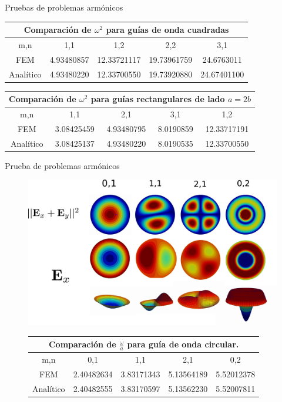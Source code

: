 \documentclass[xcolor=table,serif]{beamer}
\begin{document}
	\begin{frame}{Pruebas de problemas armónicos}
		\begin{center}
		\begin{tabular}{|c|c|c|c|c|}
		\hline
		\multicolumn{5}{|c|}{Comparación de $\omega^2$ para guías de onda cuadradas} \\
		\hline 
		m,n & 1,1 & 1,2 & 2,2 & 3,1 \\ 
		\hline 
		FEM & 4.93480857 & 12.33721117 & 19.73961759 & 24.6763011 \\ 
		\hline 
		Analítico & 4.93480220 & 12.33700550 & 19.73920880 & 24.67401100 \\ 
		\hline 
		\end{tabular} 
		\end{center}
		\begin{center}
	\begin{tabular}{|c|c|c|c|c|}
	\hline
	\multicolumn{5}{|c|}{Comparación de $\omega^2$ para guías rectangulares de lado $a =2b$} \\
	\hline 
	m,n & 1,1 & 2,1 & 3,1 & 1,2 \\ 
	\hline 
	FEM     & 3.08425459 & 4.93480795 & 8.0190859 & 12.33717191 \\ 
	\hline 
	Analítico & 3.08425137 & 4.93480220 & 8.0190535 & 12.33700550 \\ 
	\hline 
	\end{tabular} 
	\end{center}
	\end{frame}
	\begin{frame}{Prueba de problemas armónicos}
	\begin{figure}
\centering
\includegraphics[scale=0.07]{circular_waveguide.eps}
\small
\begin{center}
\begin{tabular}{|c|c|c|c|c|}
\hline
\multicolumn{5}{|c|}{Comparación de $\frac{\omega}{a}$ para guía de onda circular.} \\
\hline 
m,n & 0,1 & 1,1 & 2,1 & 0,2 \\ 
\hline 
FEM     & 2.40482634 & 3.83171343 & 5.13564189 & 5.52012378 \\ 
\hline 
Analítico & 2.40482555 & 3.83170597 & 5.13562230 & 5.52007811 \\ 
\hline 
\end{tabular} 
\end{center}
\end{figure}	
	\end{frame}
\end{document}
